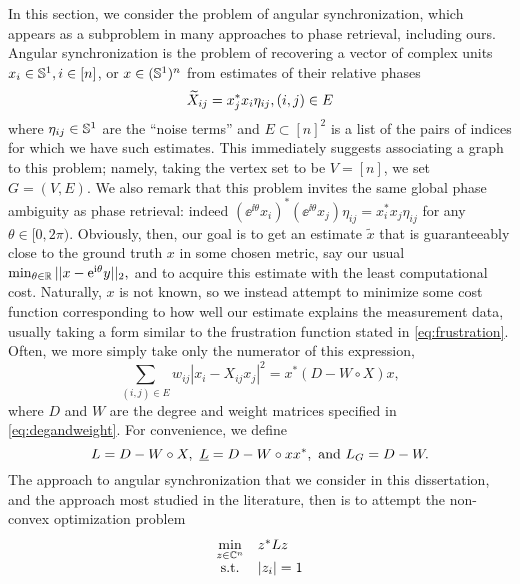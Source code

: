 In this section, we consider the problem of angular synchronization, which appears as a subproblem in many approaches to phase retrieval, including ours.  Angular synchronization is the problem of recovering a vector of complex units $x_i \in \mathbb{S}^1, i \in [n]$, or $x \in (\mathbb{S}^1)^n$ from estimates of their relative phases \[\widetilde{X}_{ij} = x_j^* x_i \eta_{ij}, (i, j) \in E\] where $\eta_{ij} \in \mathbb{S}^1$ are the ``noise terms'' and $E \subset [n]^2$ is a list of the pairs of indices for which we have such estimates.  This immediately suggests associating a graph to this problem; namely, taking the vertex set to be $V = [n]$, we set $G = (V, E)$.  We also remark that this problem invites the same global phase ambiguity as phase retrieval: indeed $(\ee^{\ii \theta} x_i)^* (\ee^{\ii \theta} x_j) \eta_{ij} = x_i^* x_j \eta_{ij}$ for any $\theta \in [0, 2\pi)$.  Obviously, then, our goal is to get an estimate $\tilde{x}$ that is guaranteeably close to the ground truth $x$ in some chosen metric, say our usual $\min_{\theta \in \mathbb{R}} || x - \mathrm{e}^{\mathrm{i} \theta} y ||_2,$ and to acquire this estimate with the least computational cost.  Naturally, $x$ is not known, so we instead attempt to minimize some cost function corresponding to how well our estimate explains the measurement data, usually taking a form similar to the frustration function stated in \eqref{eq:frustration}.  Often, we more simply take only the numerator of this expression, \[\sum_{(i, j) \in E} w_{ij} |x_i - X_{ij} x_j|^2 = x^* (D - W \circ X) x, \label{eq:ang_sync_cost}\] where $D$ and $W$ are the degree and weight matrices specified in \eqref{eq:degandweight}.  For convenience, we define \begin{equation} L = D - W \circ X, \ \underline{L} = D - W \circ x x^*, \ \text{and} \ L_G = D - W. \label{eq:L_defs} \end{equation}  The approach to angular synchronization that we consider in this dissertation, and the approach most studied in the literature, then is to attempt the non-convex optimization problem \begin{equation} \begin{array}{cl} \min\limits_{z \in \mathbb{C}^n} & z^* L z \\ \text{s.t.} & |z_i| = 1 \end{array} \label{eq:ang_sync}\end{equation}

